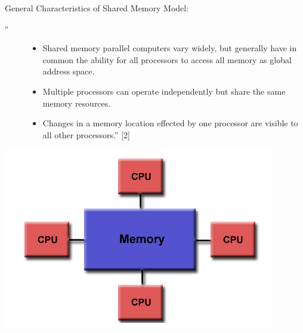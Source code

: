 \documentclass[letterpaper,10pt,openany,oneside]{sphinxmanual}
\begin{document}
General Characteristics of Shared Memory Model:
\begin{description}
\item[{``}] \leavevmode\begin{itemize}
\item {} 
Shared memory parallel computers vary widely, but generally have in common the ability for all processors to access all memory as global address space.

\item {} 
Multiple processors can operate independently but share the same memory resources.

\item {} 
Changes in a memory location effected by one processor are visible to all other processors.'' {[}2{]}

\end{itemize}

\end{description}

{\hfill\includegraphics{SharedMemoryUMA.png}\hfill}
\end{document}
